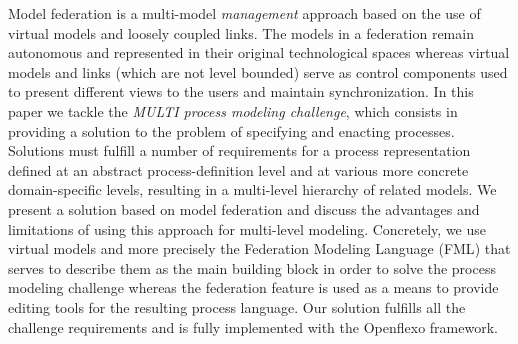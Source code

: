 Model federation is a multi-model \emph{management} approach based on the use
of virtual models and loosely coupled links. The models in a federation remain
autonomous and represented in their original technological spaces whereas
virtual models and links (which are not level bounded) serve as control
components used to present different views to the users and maintain
synchronization. In this paper we tackle the \emph{MULTI process modeling
challenge}, which consists in providing a solution to the problem of specifying
and enacting processes. Solutions must fulfill a number of requirements for a
process representation defined at an abstract process-definition level and at
various more concrete domain-specific levels, resulting in a multi-level
hierarchy of related models. We present a solution based on model federation
and discuss the advantages and limitations of using this approach for
multi-level modeling. Concretely, we use virtual models and more precisely the
Federation Modeling Language ({FML}) that serves to describe them as the main
building block in order to solve the process modeling challenge whereas the
federation feature is used as a means to provide editing tools for the
resulting process language. Our solution fulfills all the challenge
requirements and is fully implemented with the Openflexo framework.


